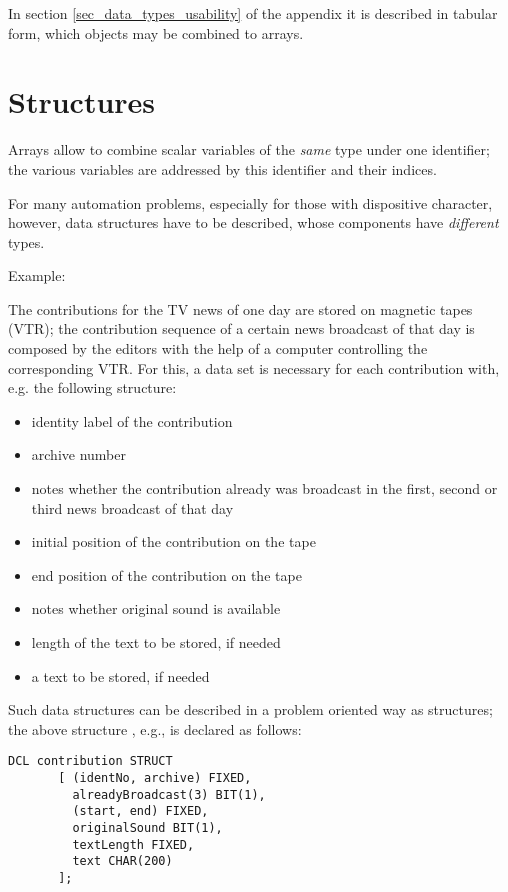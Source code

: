 In section \ref{sec_data_types_usability} of the appendix it is described
 in tabular form, which objects may be combined to arrays.

\section{Structures}   %
\label{sec_struct}

Arrays allow to combine scalar variables of the {\it same} type under
one identifier; the various variables are addressed by this identifier
and their indices.

For many automation problems, especially for those with dispositive
character, however, data structures have to be described, whose
components have {\it different} types.

Example:

The contributions for the TV news of one day are stored on magnetic
tapes (VTR); the contribution sequence of a certain news broadcast of
that day is composed by the editors with the help of a computer
controlling the corresponding VTR. For this, a data set is necessary for
each contribution with, e.g. the following structure:

\begin{itemize}
\item identity label of the contribution
\item archive number
\item notes whether the contribution already was broadcast in the first,
second or third news broadcast of that day
\item initial position of the contribution on the tape
\item end position of the contribution on the tape
\item notes whether original sound is available
\item length of the text to be stored, if needed
\item a text to be stored, if needed
\end{itemize}

Such data structures can be described in a problem oriented way as
structures; the above structure  , e.g., is declared as
follows:

\begin{lstlisting}
DCL contribution STRUCT 
       [ (identNo, archive) FIXED,
         alreadyBroadcast(3) BIT(1),
         (start, end) FIXED,
         originalSound BIT(1),
         textLength FIXED,
         text CHAR(200)
       ];
\end{lstlisting}

